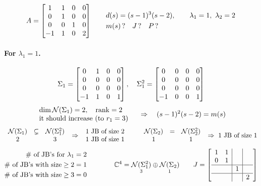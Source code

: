\begin{example}
\[
A=\begin{bmatrix}1&1&0&0\\0&1&0&0\\0&0&1&0\\-1&1&0&2\end{bmatrix}
\qquad
\begin{aligned}
&d(s)=(s-1)^3(s-2),\qquad \lambda_1=1,\ \lambda_2=2\\
&m(s)\,?\quad J\,?\quad P\,?
\end{aligned}
\]
\paragraph{For $\lambda_1=1$.}
\[
\Sigma_1=\begin{bmatrix}0&1&0&0\\0&0&0&0\\0&0&0&0\\-1&1&0&1\end{bmatrix},
\quad
\Sigma_1^2=\begin{bmatrix}0&0&0&0\\0&0&0&0\\0&0&0&0\\-1&0&0&1\end{bmatrix}
\]
\[
\begin{array}{l}\dim\mathcal{N}(\Sigma_1)=2,\quad \operatorname{rank}=2\\ \text{it should increase (to }r_1=3)\end{array}
\quad\Rightarrow\quad (s-1)^2(s-2)=m(s)
\]
\[
\begin{array}{ccc}
\mathcal{N}(\Sigma_1)&\subsetneq&\mathcal{N}(\Sigma_1^2)\\
2&&3
\end{array}
\ \Rightarrow\
\begin{array}{l}
\text{1 JB of size 2}\\ \text{1 JB of size 1}
\end{array}
\qquad
\begin{array}{ccc}
\mathcal{N}(\Sigma_2)&=&\mathcal{N}(\Sigma_2^2)\\
1&&1
\end{array}
\ \Rightarrow\ \text{1 JB of size 1}
\]
\[
\begin{aligned}
\#\text{ of JB's for }\lambda_1&=2\\
\#\text{ of JB's with size}\geq2&=1\\
\#\text{ of JB's with size}\geq3&=0
\end{aligned}
\qquad\qquad
\mathbb{C}^4=\underset{3}{\mathcal{N}(\Sigma_1^2)}\oplus\underset{1}{\mathcal{N}(\Sigma_2)}
\qquad
J=\left[\begin{array}{cc|c|c}1&1&&\\0&1&&\\\hline &&1&\\\hline &&&2\end{array}\right]
\]


\end{example}
